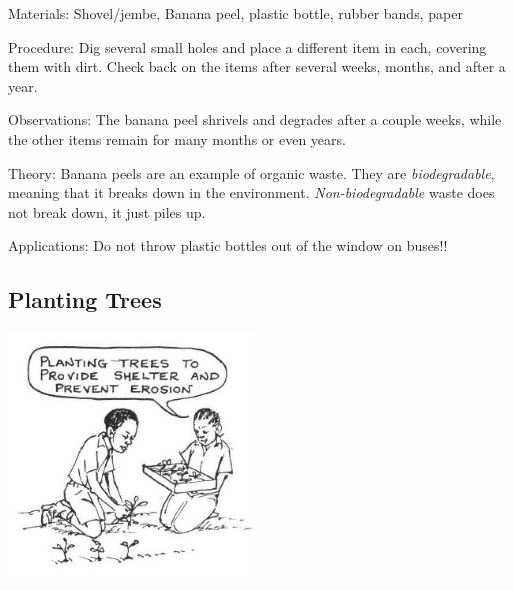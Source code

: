\begin{multicols}{2}
\begin{description*}
\item[Materials:]{Shovel/jembe, Banana peel, plastic bottle, rubber bands, paper}
\item[Procedure:]{Dig several small holes and place a different item in each, covering them with dirt. Check back on the items after several weeks, months, and after a year.}
\item[Observations:]{The banana peel shrivels and degrades after a couple weeks, while the other items remain for many months or even years.}
\item[Theory:]{Banana peels are an example of organic waste. They are \emph{biodegradable}}, meaning that it breaks down in the environment. \emph{Non-biodegradable} waste does not break down, it just piles up.
\item[Applications:]{Do not throw plastic bottles out of the window on buses!!}
\end{description*}

\subsection{Planting Trees}

\begin{center}
\includegraphics[width=0.49\textwidth]{./img/source/planting-trees.jpg}
\end{center}


\end{multicols}
